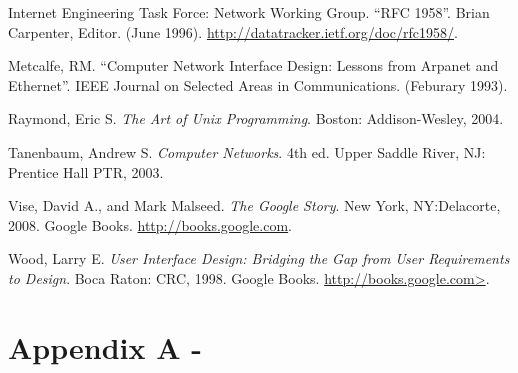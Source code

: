 \documentclass[12pt]{article}
\begin{document}
\renewcommand{\refname}{\section{References}}
\begin{thebibliography}{10}

 Internet Engineering Task Force: Network Working Group.
  \newblock ``RFC 1958''.
  \newblock Brian Carpenter, Editor.
  \newblock (June 1996).
  \newblock \url{http://datatracker.ietf.org/doc/rfc1958/}.

 Metcalfe, RM.
  \newblock ``Computer Network Interface Design: Lessons from
  Arpanet and Ethernet''.
  \newblock IEEE Journal on Selected Areas in Communications.
  \newblock (Feburary 1993).

 Raymond, Eric S.
  \newblock \emph{The Art of Unix Programming}.
  \newblock Boston: Addison-Wesley, 2004.

 Tanenbaum, Andrew S.
  \newblock \emph{Computer Networks}. 4th ed.
  \newblock Upper Saddle River, NJ: Prentice Hall PTR, 2003.

 Vise, David A., and Mark Malseed.
  \newblock \emph{The Google Story}.
  \newblock New York, NY:Delacorte, 2008.
  \newblock Google Books.
  \newblock \url{http://books.google.com}.

 Wood, Larry E.
  \newblock \emph{User Interface Design: Bridging the Gap from User
    Requirements to Design}.
  \newblock Boca Raton: CRC, 1998.
  \newblock Google Books.
  \newblock \url{http://books.google.com>}.

\end{thebibliography}


\pagebreak

\section{Appendix A - }

\pagebreak
\end{document}
